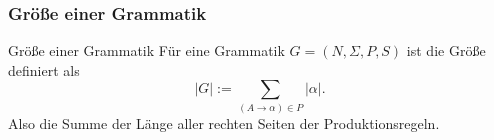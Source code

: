 \begin{frame}
	\frametitle{Größe einer Grammatik}


	\begin{block}{Größe einer Grammatik}
		Für eine Grammatik $G = (N, \Sigma, P, S)$ ist die Größe definiert als
		\begin{equation*}
			|G| := \sum_{(A \rightarrow \alpha) \in P} |\alpha|.
		\end{equation*}
		Also die Summe der Länge aller rechten Seiten der Produktionsregeln.
	\end{block}

\end{frame}

